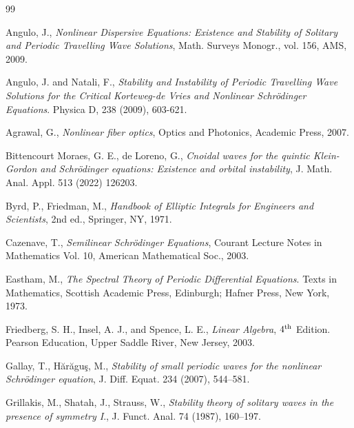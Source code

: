 \documentclass[10pt,reqno,a4paper]{amsart} %
\theoremstyle{definition} %
\numberwithin{equation}{section}
\numberwithin{figure}{section}
\begin{document}
\begin{thebibliography}{99}

 Angulo, J., \textit{Nonlinear Dispersive Equations: Existence and Stability of Solitary and Periodic Travelling Wave Solutions}, Math. Surveys Monogr., vol. 156, AMS, 2009. 

  Angulo, J. and Natali, F., \textit{Stability and Instability of Periodic Travelling Wave Solutions for the Critical Korteweg-de Vries and Nonlinear Schrödinger Equations}. Physica D, 238 (2009), 603-621.


 Agrawal, G., \textit{Nonlinear fiber optics}, Optics and Photonics, Academic
Press, 2007.



 Bittencourt Moraes, G. E., de Loreno, G., \textit{Cnoidal waves for the quintic Klein-Gordon and Schrödinger equations: Existence and orbital instability}, J. Math. Anal. Appl. 513 (2022) 126203.



 Byrd, P., Friedman, M., \textit{ Handbook of Elliptic Integrals for Engineers and Scientists}, 2nd ed., Springer, NY, 1971.

 Cazenave, T., \textit{Semilinear Schrödinger Equations}, Courant Lecture Notes in Mathematics Vol. 10, American Mathematical Soc., 2003.



 Eastham, M., \textit{The Spectral Theory of Periodic Differential Equations}. Texts in Mathematics, Scottish Academic Press, Edinburgh; Hafner Press, New York, 1973. 
	
	 Friedberg, S. H., Insel, A. J., and Spence, L. E., \textit{Linear Algebra}, $4^{\rm th}$ Edition. Pearson Education, Upper Saddle River, New Jersey, 2003.



 Gallay, T., H\u ar\u agu\c s, M., \textit{ Stability of small periodic waves for the nonlinear Schrödinger equation}, J. Diff.
Equat. 234 (2007), 544–581.



 Grillakis, M., Shatah, J., Strauss, W.,\textit{ Stability theory of solitary waves in the presence of symmetry
I}., J. Funct. Anal. 74 (1987), 160--197.



\end{thebibliography}
\end{document}
